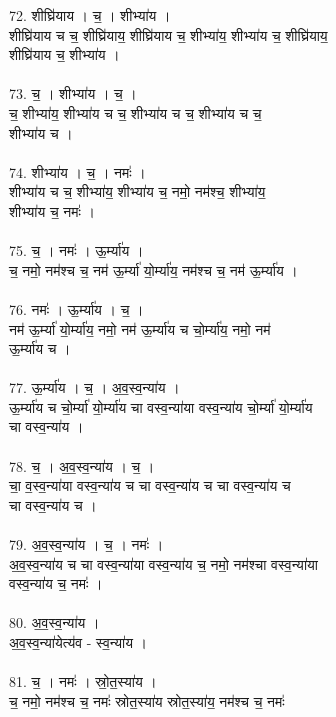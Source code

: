 72. शीघ्रि॑याय । च॒ । शीभ्या॑य ।\\
शीघ्रि॑याय च च॒ शीघ्रि॑याय॒ शीघ्रि॑याय च॒ शीभ्या॑य॒ शीभ्या॑य च॒ शीघ्रि॑याय॒\\
शीघ्रि॑याय च॒ शीभ्या॑य ।\\
\\
73. च॒ । शीभ्या॑य । च॒ ।\\
च॒ शीभ्या॑य॒ शीभ्या॑य च च॒ शीभ्या॑य च च॒ शीभ्या॑य च च॒\\
शीभ्या॑य च ।\\
\\
74. शीभ्या॑य । च॒ । नमः॑ ।\\
शीभ्या॑य च च॒ शीभ्या॑य॒ शीभ्या॑य च॒ नमो॒ नम॑श्च॒ शीभ्या॑य॒\\
शीभ्या॑य च॒ नमः॑ ।\\
\\
75. च॒ । नमः॑ । ऊ॒र्म्या॑य ।\\
च॒ नमो॒ नम॑श्च च॒ नम॑ ऊ॒र्म्या॑ यो॒र्म्या॑य॒ नम॑श्च च॒ नम॑ ऊ॒र्म्या॑य ।\\
\\
76. नमः॑ । ऊ॒र्म्या॑य । च॒ ।\\
नम॑ ऊ॒र्म्या॑ यो॒र्म्या॑य॒ नमो॒ नम॑ ऊ॒र्म्या॑य च चो॒र्म्या॑य॒ नमो॒ नम॑\\
ऊ॒र्म्या॑य च ।\\
\\
77. ऊ॒र्म्या॑य । च॒ । अ॒व॒स्व॒न्या॑य ।\\
ऊ॒र्म्या॑य च चो॒र्म्या॑ यो॒र्म्या॑य चा वस्व॒न्या॑या वस्व॒न्या॑य चो॒र्म्या॑ यो॒र्म्या॑य\\
चा वस्व॒न्या॑य ।\\
\\
78. च॒ । अ॒व॒स्व॒न्या॑य । च॒ ।\\
चा॒ व॒स्व॒न्या॑या वस्व॒न्या॑य च चा वस्व॒न्या॑य च चा वस्व॒न्या॑य च\\
चा वस्व॒न्या॑य च ।\\
\\
79. अ॒व॒स्व॒न्या॑य । च॒ । नमः॑ ।\\
अ॒व॒स्व॒न्या॑य च चा वस्व॒न्या॑या वस्व॒न्या॑य च॒ नमो॒ नम॑श्चा वस्व॒न्या॑या\\
वस्व॒न्या॑य च॒ नमः॑ ।\\
\\
80. अ॒व॒स्व॒न्या॑य ।\\
अ॒व॒स्व॒न्या॑येत्य॑व - स्व॒न्या॑य ।\\
\\
81. च॒ । नमः॑ । स्रो॒त॒स्या॑य ।\\
च॒ नमो॒ नम॑श्च च॒ नमः॑ स्रोत॒स्या॑य स्रोत॒स्या॑य॒ नम॑श्च च॒ नमः॑\\
